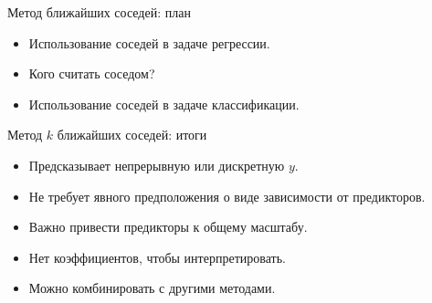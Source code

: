 
\begin{frame} %


\end{frame}



\begin{frame}{Метод ближайших соседей: план}
  \begin{itemize}[<+->]
    \item Использование соседей в задаче регрессии. 
    \item Кого считать соседом?
    \item Использование соседей в задаче классификации.
  \end{itemize}

\end{frame}



\begin{frame}{Метод $k$ ближайших соседей: итоги}

  \begin{itemize}[<+->]
    \item Предсказывает непрерывную или дискретную $y$.
    \item Не требует явного предположения \alert{о виде зависимости} от предикторов.
    \item Важно привести \alert{предикторы к общему масштабу}.
    \item \alert{Нет коэффициентов}, чтобы интерпретировать. 
    \item Можно комбинировать с другими методами.
  \end{itemize}
\end{frame}

